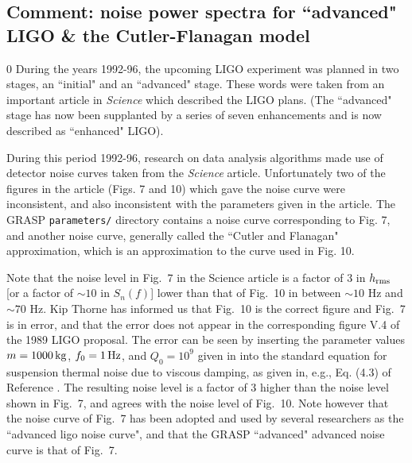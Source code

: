 \subsection{Comment: noise power spectra for ``advanced" LIGO \& the Cutler-Flanagan model}
\label{subsec:cutlerflanagan}
\setcounter{equation}0
During the years 1992-96, the upcoming LIGO experiment was planned
in two stages, an ``initial" and an ``advanced" stage.  These words
were taken from an important article in {\it Science} \cite{Science92}
which described the LIGO plans.  (The ``advanced" stage has now been
supplanted by a series of seven enhancements and is now described as
``enhanced" LIGO).

During this period 1992-96, research on data analysis algorithms
made use of detector noise curves taken from the {\it Science}
article. Unfortunately two of the figures in the article (Figs. 7 and
10) which gave the noise curve were inconsistent, and also inconsistent
with the parameters given in the article.  The GRASP {\tt parameters/}
directory contains a noise curve corresponding to Fig. 7, and another
noise curve, generally called the ``Cutler and Flanagan" approximation,
which is an approximation to the curve used in Fig. 10.

Note that the noise level in Fig.\ 7 in the Science article
\cite{Science92} is a factor of 3 in $h_{\rm rms}$ [or a factor of $\sim
10$ in $S_n(f)$] lower than that of Fig.\ 10 in between $\sim 10$ Hz and
$\sim 70$ Hz.  Kip Thorne has informed us that Fig.\ 10 is the correct
figure and Fig.\ 7 is in error, and that the error does not appear in
the corresponding figure V.4 of the 1989 LIGO proposal.  The error can
be seen by inserting the parameter values $m = 1000 \, {\rm kg}$, $f_0
= 1 \, {\rm Hz}$, and $Q_0 = 10^9$ given in \cite{Science92} into the
standard equation for suspension thermal noise due to viscous damping,
as given in, e.g., Eq. (4.3) of Reference \cite{finnandchernoff}.
The resulting noise level is a factor of 3 higher than the noise
level shown in Fig.\ 7, and agrees with the noise level of Fig.\ 10.
Note however that the noise curve of Fig.\ 7 has been adopted and used
by several researchers as the ``advanced ligo noise curve", and that the
GRASP ``advanced" advanced noise curve is that of Fig.\ 7.

